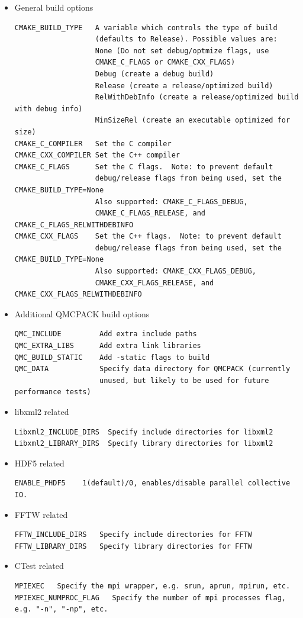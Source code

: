 \begin{itemize}
\begin{verbatim}
\end{verbatim}
  \item General build options
\begin{verbatim}
CMAKE_BUILD_TYPE   A variable which controls the type of build
                   (defaults to Release). Possible values are:
                   None (Do not set debug/optmize flags, use
                   CMAKE_C_FLAGS or CMAKE_CXX_FLAGS)
                   Debug (create a debug build)
                   Release (create a release/optimized build)
                   RelWithDebInfo (create a release/optimized build with debug info)
                   MinSizeRel (create an executable optimized for size)
CMAKE_C_COMPILER   Set the C compiler
CMAKE_CXX_COMPILER Set the C++ compiler
CMAKE_C_FLAGS      Set the C flags.  Note: to prevent default
                   debug/release flags from being used, set the CMAKE_BUILD_TYPE=None
                   Also supported: CMAKE_C_FLAGS_DEBUG,
                   CMAKE_C_FLAGS_RELEASE, and CMAKE_C_FLAGS_RELWITHDEBINFO
CMAKE_CXX_FLAGS    Set the C++ flags.  Note: to prevent default
                   debug/release flags from being used, set the CMAKE_BUILD_TYPE=None
                   Also supported: CMAKE_CXX_FLAGS_DEBUG,
                   CMAKE_CXX_FLAGS_RELEASE, and CMAKE_CXX_FLAGS_RELWITHDEBINFO
\end{verbatim}
\item Additional QMCPACK build options
\begin{verbatim}
QMC_INCLUDE         Add extra include paths
QMC_EXTRA_LIBS      Add extra link libraries
QMC_BUILD_STATIC    Add -static flags to build
QMC_DATA            Specify data directory for QMCPACK (currently
                    unused, but likely to be used for future performance tests)
\end{verbatim}
\item libxml2 related
\begin{verbatim}
Libxml2_INCLUDE_DIRS  Specify include directories for libxml2
Libxml2_LIBRARY_DIRS  Specify library directories for libxml2
\end{verbatim}
 \item HDF5 related
\begin{verbatim}
ENABLE_PHDF5    1(default)/0, enables/disable parallel collective IO.
\end{verbatim}
 \item FFTW related
\begin{verbatim}
FFTW_INCLUDE_DIRS   Specify include directories for FFTW
FFTW_LIBRARY_DIRS   Specify library directories for FFTW
\end{verbatim}
 \item CTest related
\begin{verbatim}
MPIEXEC   Specify the mpi wrapper, e.g. srun, aprun, mpirun, etc.
MPIEXEC_NUMPROC_FLAG   Specify the number of mpi processes flag, e.g. "-n", "-np", etc.

\end{verbatim}
\end{itemize}

